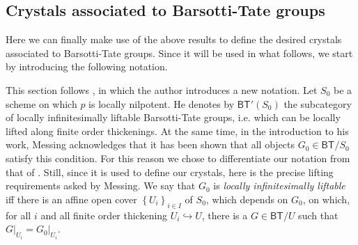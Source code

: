 \subsection{Crystals associated to Barsotti-Tate groups}
Here we can finally make use of the above results to define the desired crystals
associated to Barsotti-Tate groups.
Since it will be used in what follows,
we start by introducing the following notation.


\begin{rem}[]\label{rem:LocallyLiftableBTG}
	This section follows \cite[Chpater IV, \S2]{Messing},
	in which the author introduces a new notation.
	Let \(S_0\) be a scheme on which \(p\) is locally nilpotent.
	He denotes by $\mathsf{BT}'(S_0)$ the subcategory of
	locally infinitesimally liftable Barsotti-Tate groups, i.e$.$ 
	which can be locally lifted along finite order thickenings.
	At the same time, in the introduction to his work, Messing acknowledges that
	it has been shown that all objects $G_0 \in \mathsf{BT}/S_0$ satisfy
	this condition.
	For this reason we chose to differentiate our notation from that of \cite{Messing}.
	Still, since it is used to define our crystals, here is the precise lifting
	requirements asked by Messing.
	We say that $G_0$ is \emph{locally infinitesimally liftable} iff
	there is an affine open cover $\left\{ U_i \right\}_{i \in I}$ of $S_0$, which depends on $G_0$, 
	on which, for all $i$ and all finite order thickening $U_i \hookrightarrow U$,
	there is a $G \in \mathsf{BT}/U$ such that
	$\left.G\right|_{U_i} = \left.G_0\right|_{U_i}$.
\end{rem}


